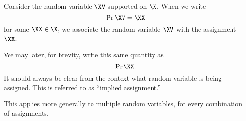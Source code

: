\begin{note}

  Consider the random variable $\XV$ supported on $\X$. 
  When we write $$\Pr{\XV = \XX}$$
  for some $\XX \in \X,$
  we associate the random variable $\XV$ with the assignment $\XX$.

  We may later, for brevity, write this same quantity
  as $$\Pr{\XX}.$$
  It should always be clear from the context what random variable is being assigned.
  This is referred to as ``implied assignment.''

  This applies more generally to multiple random variables,
  for every combination of assignments.
\end{note}
